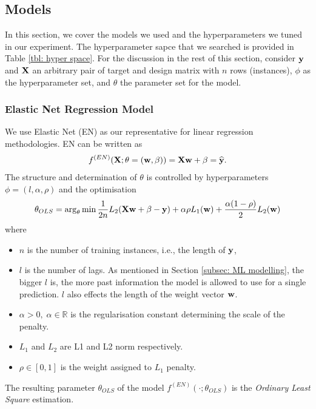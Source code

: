 \subsection{Models}\label{subsec: models}
In this section, we cover the models we used and the hyperparameters we tuned in our experiment. The hyperparameter sapce that we searched is provided in Table \ref{tbl: hyper space}. For the discussion in the rest of this section, consider $\mathbf{y}$ and $\mathbf{X}$ an arbitrary pair of target and design matrix with $n$ rows (instances), $\phi$ as the hyperparameter set, and $\theta$ the parameter set for the model.

\subsubsection{Elastic Net Regression Model}
We use Elastic Net (EN) as our representative for linear regression methodologies. EN can be written as
\begin{gather*}
    f^{(EN)} (\mathbf{X} ; \theta = (\mathbf{w}, \mathbf{\beta})) = \mathbf{X} \mathbf{w} + \mathbf{\beta} = \widehat{\mathbf{y}}.
\end{gather*}
The structure and determination of $\theta$ is controlled by hyperparameters $\phi = (l, \alpha, \rho)$ and the optimisation
\begin{equation*}
    \theta_{OLS} = \arg_{\theta} \min \frac{1}{2n} L_2(\mathbf{X} \mathbf{w} + \mathbf{\beta} - \mathbf{y}) + \alpha \rho L_1(\mathbf{w}) + \frac{\alpha (1 - \rho)}{2} L_2(\mathbf{w})
\end{equation*}
where
\begin{itemize}
    \item $n$ is the number of training instances, i.e., the length of $\mathbf{y}$,
    \item $l$ is the number of lags. As mentioned in Section \ref{subsec: ML modelling}, the bigger $l$ is, the more past information the model is allowed to use for a single prediction. $l$ also effects the length of the weight vector $\mathbf{w}$.
    \item $\alpha > 0, \; \alpha \in \mathbb{R}$ is the regularisation constant determining the scale of the penalty.
    \item $L_1$ and $L_2$ are L1 and L2 norm respectively.
    \item $\rho \in [0, 1]$ is the weight assigned to $L_1$ penalty.
\end{itemize}
The resulting parameter $\theta_{OLS}$ of the model $f^{(EN)}(\cdot ; \theta_{OLS})$ is the \textit{Ordinary Least Square} estimation.


